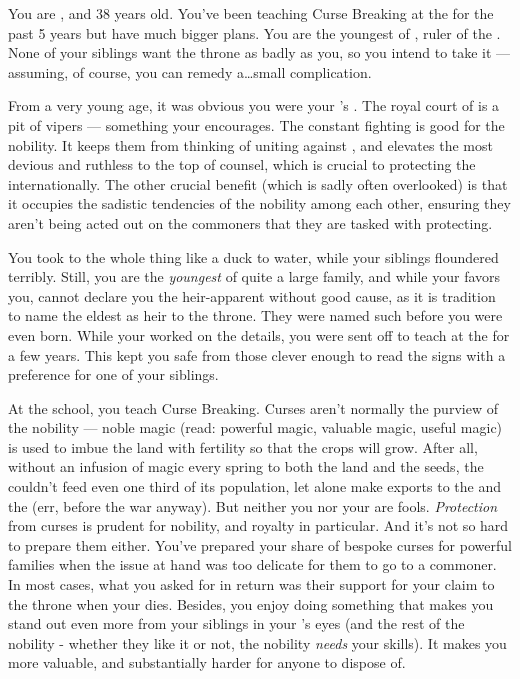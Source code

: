\documentclass[char]{GL2020}
\begin{document}
\name{\cPrince{}}

You are \cPrince{\intro}, and 38 years old. You've been teaching Curse Breaking at the \pSchool{} for the past 5 years but have much bigger plans. You are the youngest \cPrince{\offspring} of \cQueen{\intro}, ruler of the \pFarm{}. None of your siblings want the throne as badly as you, so you intend to take it — assuming, of course, you can remedy a\ldots{}small complication.

From a very young age, it was obvious you were your \cQueen{\parent}'s \cPrince{\offspring}. The royal court of \pFarm{} is a pit of vipers — something your \cQueen{\parent} encourages. The constant fighting is good for the nobility. It keeps them from thinking of uniting against \cQueen{\them}, and elevates the most devious and ruthless to the top of \cQueen{\their} counsel, which is crucial to protecting the \pFarm{} internationally. The other crucial benefit (which is sadly often overlooked) is that it occupies the sadistic tendencies of the nobility among each other, ensuring they aren’t being acted out on the commoners that they are tasked with protecting. 

You took to the whole thing like a duck to water, while your siblings floundered terribly. Still, you are the \emph{youngest} of quite a large family, and while your \cQueen{\parent} favors you, \cQueen{\they} cannot declare you the heir-apparent without good cause, as it is tradition to name the eldest as heir to the throne. They were named such before you were even born.  While your \cQueen{\parent} worked on the details, you were sent off to teach at the \pSchool{} for a few years. This kept you safe from those clever enough to read the signs with a preference for one of your siblings.

At the school, you teach Curse Breaking. Curses aren't normally the purview of the nobility — noble magic (read: powerful magic, valuable magic, useful magic) is used to imbue the land with fertility so that the crops will grow. After all, without an infusion of magic every spring to both the land and the seeds, the \pFarm{} couldn't feed even one third of its population, let alone make exports to the \pTech{} and the \pShip{} (err, before the war anyway). But neither you nor your \cQueen{\parent} are fools. \emph{Protection} from curses is prudent for nobility, and royalty in particular. And it's not so hard to prepare them either. You've prepared your share of bespoke curses for powerful families when the issue at hand was too delicate for them to go to a commoner. In most cases, what you asked for in return was their support for your claim to the throne when your \cQueen{\parent} dies. Besides, you enjoy doing something that makes you stand out even more from your siblings in your \cQueen{\parent}’s eyes (and the rest of the nobility - whether they like it or not, the nobility \emph{needs} your skills).  It makes you more valuable, and substantially harder for anyone to dispose of.
\end{document}

